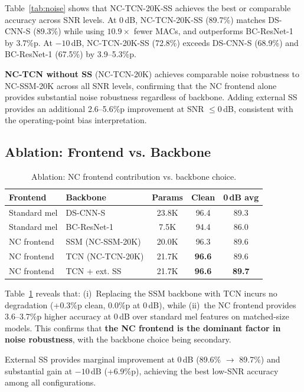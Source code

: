 \documentclass[conference]{IEEEtran}
\begin{document}
Table~\ref{tab:noise} shows that NC-TCN-20K-SS achieves the best or comparable accuracy across SNR levels.
At 0\,dB, NC-TCN-20K-SS (89.7\%) matches DS-CNN-S (89.3\%) while using $10.9\times$ fewer MACs, and outperforms BC-ResNet-1 by 3.7\%p.
At $-10$\,dB, NC-TCN-20K-SS (72.8\%) exceeds DS-CNN-S (68.9\%) and BC-ResNet-1 (67.5\%) by 3.9--5.3\%p.

\textbf{NC-TCN without SS} (NC-TCN-20K) achieves comparable noise robustness to NC-SSM-20K across all SNR levels, confirming that the NC frontend alone provides substantial noise robustness regardless of backbone.
Adding external SS provides an additional 2.6--5.6\%p improvement at SNR $\leq 0$\,dB, consistent with the operating-point bias interpretation.

\subsection{Ablation: Frontend vs. Backbone}

\begin{table}[t]
\centering
\caption{Ablation: NC frontend contribution vs. backbone choice.}
\label{tab:ablation}
\setlength{\tabcolsep}{4pt}
\begin{tabular}{@{}llccc@{}}
\toprule
\textbf{Frontend} & \textbf{Backbone} & \textbf{Params} & \textbf{Clean} & \textbf{0\,dB avg} \\
\midrule
Standard mel & DS-CNN-S & 23.8K & 96.4 & 89.3 \\
Standard mel & BC-ResNet-1 & 7.5K & 94.4 & 86.0 \\
\midrule
NC frontend & SSM (NC-SSM-20K) & 20.0K & 96.3 & 89.6 \\
NC frontend & TCN (NC-TCN-20K) & 21.7K & \textbf{96.6} & 89.6 \\
NC frontend & TCN + ext. SS & 21.7K & \textbf{96.6} & \textbf{89.7} \\
\bottomrule
\end{tabular}
\end{table}

Table~\ref{tab:ablation} reveals that:
(i)~Replacing the SSM backbone with TCN incurs no degradation (+0.3\%p clean, 0.0\%p at 0\,dB), while
(ii)~the NC frontend provides 3.6--3.7\%p higher accuracy at 0\,dB over standard mel features on matched-size models.
This confirms that \textbf{the NC frontend is the dominant factor in noise robustness}, with the backbone choice being secondary.

External SS provides marginal improvement at 0\,dB (89.6\% $\to$ 89.7\%) and substantial gain at $-10$\,dB (+6.9\%p), achieving the best low-SNR accuracy among all configurations.
\end{document}
